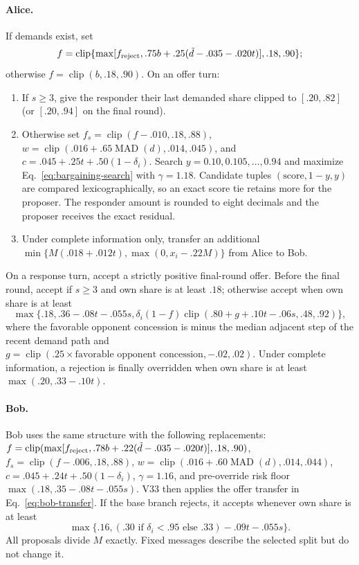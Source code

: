 \paragraph{Alice.}
If demands exist, set
\[
 f=\operatorname{clip}\{\max[f_{\rm reject},
 .75b+.25(\tilde d-.035-.020t)],.18,.90\};
\]
otherwise $f=\operatorname{clip}(b,.18,.90)$. On an offer turn:
\begin{enumerate}
 \item If $s\ge3$, give the responder their last demanded share clipped to
 $[.20,.82]$ (or $[.20,.94]$ on the final round).
 \item Otherwise set $f_s=\operatorname{clip}(f-.010,.18,.88)$,
 $w=\operatorname{clip}(.016+.65\operatorname{MAD}(d),.014,.045)$, and
 $c=.045+.25t+.50(1-\delta_i)$. Search
 $y=0.10,0.105,\ldots,0.94$ and maximize Eq.~\ref{eq:bargaining-search}
 with $\gamma=1.18$. Candidate tuples $(\text{score},1-y,y)$ are compared
 lexicographically, so an exact score tie retains more for the proposer. The
 responder amount is rounded to eight decimals and the proposer receives the
 exact residual.
 \item Under complete information only, transfer an additional
 $\min\{M(.018+.012t),\max(0,x_i-.22M)\}$ from Alice to Bob.
\end{enumerate}
On a response turn, accept a strictly positive final-round offer. Before the
final round, accept if $s\ge3$ and own share is at least $.18$; otherwise accept
when own share is at least
\[
 \max\{.18,.36-.08t-.055s,
 \delta_i(1-f)\operatorname{clip}(.80+g+.10t-.06s,.48,.92)\},
\]
where the favorable opponent concession is minus the median adjacent step of
the recent demand path and
$g=\operatorname{clip}(.25\times\text{favorable opponent concession},
-.02,.02)$. Under complete information, a rejection is finally overridden
when own share is at least $\max(.20,.33-.10t)$.

\paragraph{Bob.}
Bob uses the same structure with the following replacements:
$f=\operatorname{clip}(\max[f_{\rm reject},.78b+.22(\tilde d-.035-.020t)],.18,.90)$,
$f_s=\operatorname{clip}(f-.006,.18,.88)$,
$w=\operatorname{clip}(.016+.60\operatorname{MAD}(d),.014,.044)$,
$c=.045+.24t+.50(1-\delta_i)$, $\gamma=1.16$, and pre-override risk floor
$\max(.18,.35-.08t-.055s)$. V33 then applies the offer transfer in
Eq.~\ref{eq:bob-transfer}. If the base branch rejects, it accepts whenever own
share is at least
\[
 \max\{.16,(.30\text{ if }\delta_i<.95\text{ else }.33)-.09t-.055s\}.
\]
All proposals divide $M$ exactly. Fixed messages describe the selected split
but do not change it.

